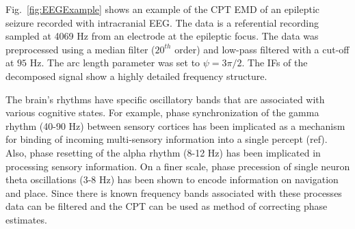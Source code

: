 \documentclass[a4paper]{IEEEtran}
\begin{document}
Fig.~\ref{fig:EEGExample} shows an example of the CPT EMD of an epileptic seizure recorded with intracranial EEG. The data is a referential recording sampled at 4069 Hz from an electrode at the epileptic focus. The data was preprocessed using a median filter ($20^{th}$ order) and low-pass filtered with a cut-off at $95$ Hz. The arc length parameter was set to $\psi=3\pi/2$. The IFs of the decomposed signal show a highly detailed frequency structure.

The brain's rhythms have specific oscillatory bands that are associated with various cognitive states. For example, phase synchronization of the gamma rhythm (40-90 Hz) between sensory cortices has been implicated as a mechanism for binding of incoming multi-sensory information into a single percept (ref). Also, phase resetting of the alpha rhythm (8-12 Hz) has been implicated in processing sensory information. On a finer scale, phase precession of single neuron theta oscillations (3-8 Hz) has been shown to encode information on navigation and place. Since there is known frequency bands associated with these processes data can be filtered and the CPT can be used as method of correcting phase estimates. 
% 
% 
\end{document}
